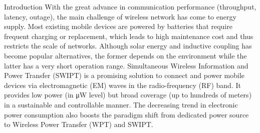 \documentclass{IEEEtran}
\begin{document}
% 

\begin{section}{Introduction}
	With the great advance in communication performance (throughput, latency, outage), the main challenge of wireless network has come to energy supply. Most existing mobile devices are powered by batteries that require frequent charging or replacement, which leads to high maintenance cost and thus restricts the scale of networks. Although solar energy and inductive coupling has become popular alternatives, the former depends on the environment while the latter has a very short operation range. Simultaneous Wireless Information and Power Transfer (SWIPT) is a promising solution to connect and power mobile devices via electromagnetic (EM) waves in the radio-frequency (RF) band. It provides low power (in \si{\uW} level) but broad coverage (up to hundreds of meters) \cite{Ng2018} in a sustainable and controllable manner. The decreasing trend in electronic power consumption also boosts the paradigm shift from dedicated power source to Wireless Power Transfer (WPT) and SWIPT.


\end{section}
\end{document}
